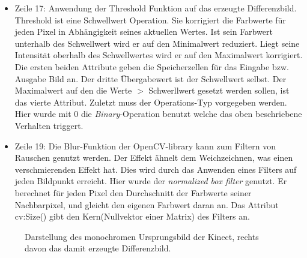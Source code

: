 		\begin{itemize}
				\item Zeile 17: Anwendung der Threshold Funktion auf das erzeugte Differenzbild. Threshold ist eine Schwellwert Operation. Sie korrigiert die Farbwerte für jeden Pixel in Abhängigkeit seines aktuellen Wertes. Ist sein Farbwert unterhalb des Schwellwert wird er auf den Minimalwert reduziert. Liegt seine Intensität oberhalb des Schwellwertes wird er auf den Maximalwert korrigiert. Die ersten beiden Attribute geben die Speicherzellen für das Eingabe bzw. Ausgabe Bild an. Der dritte Übergabewert ist der Schwellwert selbst. Der Maximalwert auf den die Werte $>$ Schwerllwert gesetzt werden sollen, ist das vierte Attribut. Zuletzt muss der Operations-Typ vorgegeben werden. Hier wurde mit $0$ die \textit{Binary}-Operation benutzt welche das oben beschriebene Verhalten triggert.
				\item Zeile 19: Die Blur-Funktion der OpenCV-library kann zum Filtern von Rauschen genutzt werden. Der Effekt ähnelt dem Weichzeichnen, was einen verschmierenden Effekt hat. Dies wird durch das Anwenden eines Filters auf jeden Bildpunkt erreicht. Hier wurde der \textit{normalized box filter} genutzt. Er berechnet für jeden Pixel den Durchschnitt der Farbwerte seiner Nachbarpixel, und gleicht den eigenen Farbwert daran an. Das Attribut cv:Size() gibt den Kern(Nullvektor einer Matrix) des Filters an.
		\end{itemize}
		\cite{cv-filter}
		\cite{unger13}
		\cite{cv-thresh}
				
		\begin{figure}[H]
		\caption{Darstellung des monochromen Ursprungsbild der Kinect, rechts davon das damit erzeugte Differenzbild.}
		\end{figure}
		
